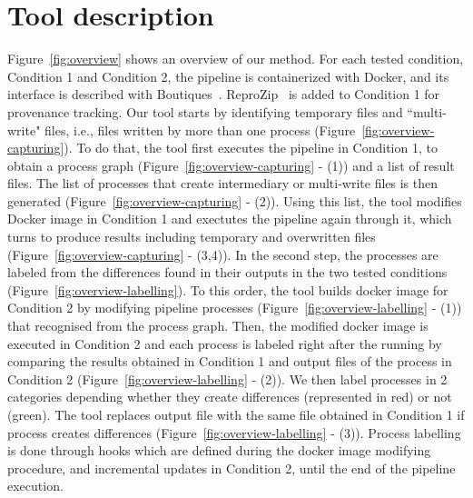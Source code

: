 \documentclass[a4paper,num-refs]{oup-contemporary}
\newcommand{\reprozip}[0]{ReproZip\xspace}
\begin{document}
\section{Tool description}

Figure~\ref{fig:overview} shows an overview of our method. For each tested
condition, Condition 1 and Condition 2, the pipeline is containerized with
Docker, and its interface is described with
Boutiques~\cite{glatard2017boutiques}. \reprozip~\cite{chirigati2016reprozip} is
added to Condition 1 for provenance tracking. Our tool starts by
identifying temporary files and ``multi-write" files, i.e., files written
by more than one process (Figure~\ref{fig:overview-capturing}). To do that,
the tool first executes the pipeline in Condition 1, to obtain a process
graph (Figure~\ref{fig:overview-capturing} - (1)) and a list of result files.
The list of processes that create intermediary or multi-write
files is then generated (Figure~\ref{fig:overview-capturing} - (2)). 
Using this list, the tool modifies Docker image in Condition 1 and
exectutes the pipeline again through it, which turns to produce results
including temporary and overwritten files
(Figure~\ref{fig:overview-capturing} - (3,4)). In the second step, the
processes are labeled from the differences found in their outputs in the
two tested conditions (Figure~\ref{fig:overview-labelling}). To this order,
the tool builds docker image for Condition 2 by modifying pipeline
processes (Figure~\ref{fig:overview-labelling} - (1)) that recognised from 
the process graph. Then, the modified docker
image is executed in Condition 2 and each process is labeled right after
the running by comparing the results obtained in Condition 1
and output files of the process in Condition 2
(Figure~\ref{fig:overview-labelling} - (2)). We then label processes in 2
categories depending whether they
create differences (represented in red) or not (green). 
The tool replaces output file with the same file obtained in Condition 1 
if process creates differences (Figure~\ref{fig:overview-labelling} - (3)).
Process labelling
is done through hooks which are defined during the docker image modifying
procedure, and incremental updates in Condition 2, until the end of the
pipeline execution.
\end{document}
